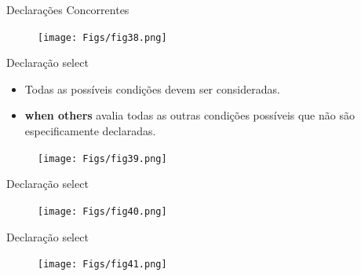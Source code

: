 \documentclass[aspectratio=169]{beamer}
\begin{document}
\begin{frame}{Declarações Concorrentes}
	\justifying
	
	\begin{figure}[h]
		\centering
		\texttt{[image: Figs/fig38.png]}
	\end{figure}
	
	
\end{frame}
\begin{frame}{Declaração select}
	\justifying

	\begin{block}{}
		\begin{itemize}
		\item Todas as possíveis condições devem ser consideradas.
		\item \textbf{when others} avalia todas as outras condições possíveis que não são especificamente declaradas.
		\end{itemize}
		
	\end{block}
	
	\begin{figure}[h]
		\centering
		\texttt{[image: Figs/fig39.png]}
	\end{figure}
	
	
\end{frame}
\begin{frame}{Declaração select}
	\justifying
	
	
	\begin{figure}[h]
		\centering
		\texttt{[image: Figs/fig40.png]}
	\end{figure}
	
	
\end{frame}
\begin{frame}{Declaração select}
	\justifying
	
	
	\begin{figure}[h]
		\centering
		\texttt{[image: Figs/fig41.png]}
	\end{figure}
	
	
\end{frame}
\end{document}
